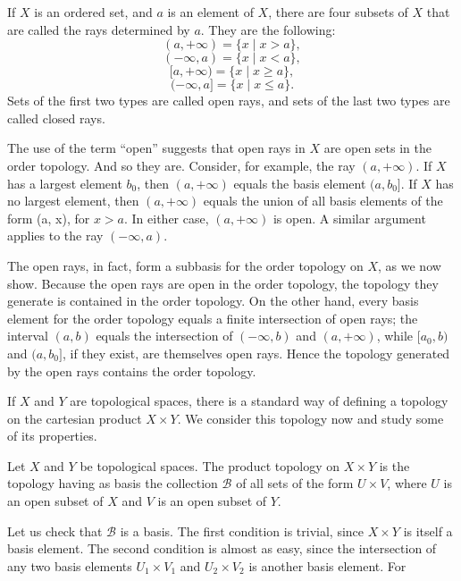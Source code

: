 \begin{definition}
 If \(X\) is an ordered set, and \(a\) is an element of \(X\), there are four subsets of \(X\) that are called the rays determined by \(a\). They are the following:
 \[
 ( {a, + \infty }) = \{ x \mid x > a\},
 \]
 \[
 ( {-\infty,a}) = \{ x \mid x < a\},
 \]
 \[
 \lbrack a, + \infty ) = \{ x \mid x \geq a\},
 \]
 \[
 ( - \infty,a\rbrack = \{ x \mid x \leq a\}.
 \]
 Sets of the first two types are called open rays, and sets of the last two types are called closed rays.
\end{definition}

The use of the term ``open'' suggests that open rays in \(X\) are open sets in the order topology. And so they are. Consider, for example, the ray \(( {a, + \infty })\). If \(X\) has a largest element \(b_{0}\), then \(( {a, + \infty })\) equals the basis element \(( {a,b_{0}}]\). If \(X\) has no largest element, then \(( {a, + \infty })\) equals the union of all basis elements of the form (a, x), for \(x > a\). In either case, \(( {a, + \infty })\) is open. A similar argument applies to the ray \(( {-\infty,a})\).

The open rays, in fact, form a subbasis for the order topology on \(X\), as we now show. Because the open rays are open in the order topology, the topology they generate is contained in the order topology. On the other hand, every basis element for the order topology equals a finite intersection of open rays; the interval \((a, b)\) equals the intersection of \(( {-\infty,b})\) and \(( {a, + \infty })\), while \([ {a_{0},b})\) and \(( {a,b_{0}}]\), if they exist, are themselves open rays. Hence the topology generated by the open rays contains the order topology.


If \(X\) and \(Y\) are topological spaces, there is a standard way of defining a topology on the cartesian product \(X \times Y\). We consider this topology now and study some of its properties.

\begin{definition}
 Let \(X\) and \(Y\) be topological spaces. The product topology on \(X \times Y\) is the topology having as basis the collection \(\mathcal{B}\) of all sets of the form \(U \times V\), where \(U\) is an open subset of \(X\) and \(V\) is an open subset of \(Y\).
\end{definition}

Let us check that \(\mathcal{B}\) is a basis. The first condition is trivial, since \(X \times Y\) is itself a basis element. The second condition is almost as easy, since the intersection of any two basis elements \(U_{1} \times {V}_{1}\) and \(U_{2} \times {V}_{2}\) is another basis element. For

